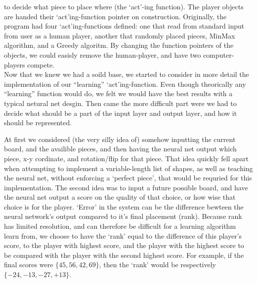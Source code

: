\documentclass{report}
\begin{document}
	to decide what piece to place where (the `act'-ing function). The player objects are handed their `act'ing-function pointer on construction. Originally, the program had four `act'ing-functions
	defined: one that read from standard input from user as	a human player, another that randomly placed pieces, MinMax algorithm, and a Greedy algoritm. By changing the function pointers of
	the objects, we could easisly remove the human-player, and have two computer-players compete.\\
	Now that we knew we had a soild base, we started to consider in more detail the implementation of our ``learning'' `act'ing-function. Even though theorically any ``learning'' function would do,
	we felt we would have the best results with a typical netural net desgin. Then came the more difficult part were we had to decide what should be a part of the input layer and output layer,
	and how it should be represented.
	
	At first we considered (the very silly idea of) somehow inputting the current board, and the availible pieces, and then having the neural net output which piece, x-y cordinate,
	and rotation/flip for that piece. That idea quickly fell apart when attempting to implement a variable-length list of shapes, as well as teaching the neural net, without enforcing a `perfect
	piece', that would be requried for this implementation.
	The second idea was to input a future possible board, and have the neural net output a score on the quality of that choice, or how wise that choice is for the player.
	`Error' in the system can be the difference bewteen the neural network's output compared to it's final placement (rank). Because rank has limited resolution, and can therefore be difficult
	for a learning algorithm learn from, we choose to have the `rank' equal to the difference of this player's score, to the player with highest score, and the player with the highest score to be
	compared with the player with the second highest score. For example, if the final scores were $\{45, 56, 42, 69\}$, then the `rank' would be respectively $\{-24, -13, -27,+13\}$. 
\end{document}

